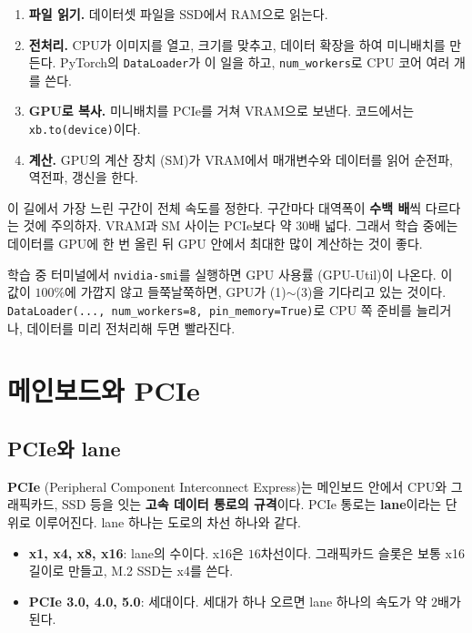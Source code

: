 \documentclass[11pt,a4paper]{article}
\begin{document}
\begin{enumerate}[label=(\arabic*)]
\item \textbf{파일 읽기.} 데이터셋 파일을 SSD에서 RAM으로 읽는다.
\item \textbf{전처리.} CPU가 이미지를 열고, 크기를 맞추고, 데이터 확장을 하여 미니배치를 만든다. PyTorch의 \texttt{DataLoader}가 이 일을 하고, \texttt{num\_workers}로 CPU 코어 여러 개를 쓴다.
\item \textbf{GPU로 복사.} 미니배치를 PCIe를 거쳐 VRAM으로 보낸다. 코드에서는 \texttt{xb.to(device)}이다.
\item \textbf{계산.} GPU의 계산 장치 (SM)가 VRAM에서 매개변수와 데이터를 읽어 순전파, 역전파, 갱신을 한다.
\end{enumerate}

이 길에서 가장 느린 구간이 전체 속도를 정한다. 구간마다 대역폭이 \textbf{수백 배}씩 다르다는 것에 주의하자.
VRAM과 SM 사이는 PCIe보다 약 $30$배 넓다. 그래서 학습 중에는 데이터를 GPU에 한 번 올린 뒤 GPU 안에서 최대한 많이 계산하는 것이 좋다.

\begin{thinkbox}
학습 중 터미널에서 \texttt{nvidia-smi}를 실행하면 GPU 사용률 (GPU-Util)이 나온다.
이 값이 $100\%$에 가깝지 않고 들쭉날쭉하면, GPU가 (1)$\sim$(3)을 기다리고 있는 것이다.
\texttt{DataLoader(..., num\_workers=8, pin\_memory=True)}로 CPU 쪽 준비를 늘리거나, 데이터를 미리 전처리해 두면 빨라진다.
\end{thinkbox}

\section{메인보드와 PCIe}\label{sec:pcie}

\subsection{PCIe와 lane}\label{sec:lane}

\textbf{PCIe} (Peripheral Component Interconnect Express)는 메인보드 안에서 CPU와 그래픽카드, SSD 등을 잇는 \textbf{고속 데이터 통로의 규격}이다.
PCIe 통로는 \textbf{lane}이라는 단위로 이루어진다. lane 하나는 도로의 차선 하나와 같다.

\begin{itemize}[leftmargin=1.5em]
\item \textbf{x1, x4, x8, x16}: lane의 수이다. x16은 $16$차선이다. 그래픽카드 슬롯은 보통 x16 길이로 만들고, M.2 SSD는 x4를 쓴다.
\item \textbf{PCIe 3.0, 4.0, 5.0}: 세대이다. 세대가 하나 오르면 lane 하나의 속도가 약 $2$배가 된다.
\end{itemize}
\end{document}
